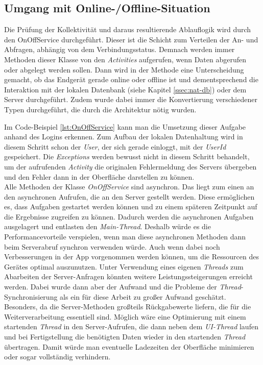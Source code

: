 \subsection{Umgang mit Online-/Offline-Situation}
\label{ssec:nat-onoffservice}
Die Prüfung der Kollektivität und daraus resultierende Ablauflogik wird durch den OnOffService durchgeführt. Dieser ist die Schicht zum Verteilen der An- und Abfragen, abhängig von dem Verbindungsstatus. Demnach werden immer Methoden dieser Klasse von den \textit{Activities} aufgerufen, wenn Daten abgerufen oder abgelegt werden sollen. Dann wird in der Methode eine Unterscheidung gemacht, ob das Endgerät gerade online oder offline ist und dementsprechend die Interaktion mit der lokalen Datenbank (siehe Kapitel \ref{ssec:nat-db}) oder dem Server durchgeführt. Zudem wurde dabei immer die Konvertierung verschiedener Typen durchgeführt, die durch die Architektur nötig wurden.

Im Code-Beispiel \ref{lst:OnOffService} kann man die Umsetzung dieser Aufgabe anhand des Logins erkennen. Zum Aufbau der lokalen Datenhaltung wird in diesem Schritt schon der \textit{User}, der sich gerade einloggt, mit der \textit{UserId} gespeichert. Die \textit{Exceptions} werden bewusst nicht in diesem Schritt behandelt, um der aufrufenden \textit{Activity} die originalen Fehlermeldung des Servers übergeben und den Fehler dann in der Oberfläche darstellen zu können.\\
Alle Methoden der Klasse \textit{OnOffService} sind asynchron. Das liegt zum einen an den asynchronen Aufrufen, die an den Server gestellt werden. Diese ermöglichen es, dass Aufgaben gestartet werden können und zu einem späteren Zeitpunkt auf die Ergebnisse zugreifen zu können. Dadurch werden die asynchronen Aufgaben ausgelagert und entlasten den \textit{Main-Thread}. Deshalb würde es die Performancevorteile verspielen, wenn man diese asynchronen Methoden dann beim Serverabruf synchron verwenden würde. Auch wenn dabei noch Verbesserungen in der App vorgenommen werden können, um die Ressourcen des Gerätes optimal auszunutzen. Unter Verwendung eines eigenen \textit{Threads} zum Abarbeiten der Server-Anfragen könnten weitere Leistungssteigerungen erreicht werden. Dabei wurde dann aber der Aufwand und die Probleme der \textit{Thread}-Synchronisierung als ein für diese Arbeit zu großer Aufwand geschätzt. Besonders, da die Server-Methoden großteils Rückgabewerte liefern, die für die Weiterverarbeitung essentiell sind. Möglich wäre eine Optimierung mit einem startenden \textit{Thread} in den Server-Aufrufen, die dann neben dem \textit{UI-Thread} laufen und bei Fertigstellung die benötigten Daten wieder in den startenden \textit{Thread} übertragen. Damit würde man eventuelle Ladezeiten der Oberfläche minimieren oder sogar vollständig verhindern.

